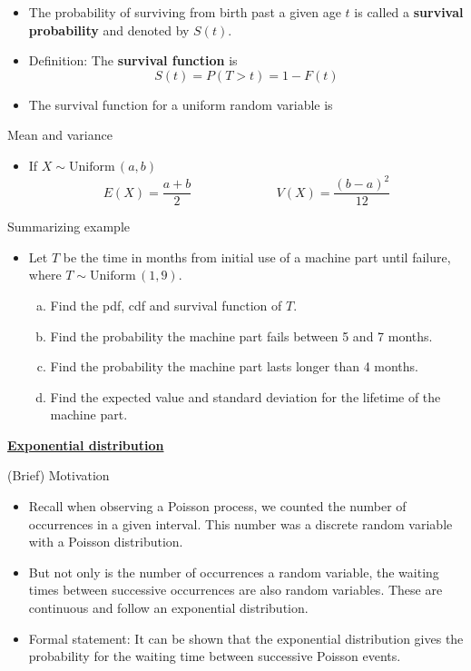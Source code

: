 \documentclass{article}
\newcommand{\bu}[1]{\textbf{\ul{#1}}}				%
\newcommand{\follow}[1]{\sim \text{#1}\,}		%
\begin{document}
\begin{itemize}
\begin{itemize}
    \end{itemize}
    \item The probability of surviving from birth past a given age $t$ is called a \textbf{survival probability} and denoted by $S(t)$.\bigskip
    \item Definition: The \textbf{survival function} is
    \[S(t) = P(T > t) = 1 - F(t)\]\vspace{20pt}
    \item The survival function for a uniform random variable is\vspace{80pt}
\end{itemize}\bigskip

Mean and variance\bigskip
\begin{itemize}
    \item If $X \follow{Uniform}(a, b)$\smallskip
    \[E(X) = \frac{a + b}{2} \hspace{80pt} V(X) = \frac{(b - a)^2}{12}\]
\end{itemize}\bigskip

Summarizing example\bigskip
\begin{itemize}
    \item Let $T$ be the time in months from initial use of a machine part until failure, where $T \follow{Uniform}(1, 9)$.
    \begin{enumerate}[a)]
        \item Find the pdf, cdf and survival function of $T$.\vspace{80pt}
        \item Find the probability the machine part fails between 5 and 7 months.\vspace{80pt}
        \item Find the probability the machine part lasts longer than 4 months.\vspace{80pt}
        \item Find the expected value and standard deviation for the lifetime of the machine part.\vspace{80pt}
    \end{enumerate}
\end{itemize}\bigskip

\bu{Exponential distribution}\bigskip

(Brief) Motivation\bigskip
\begin{itemize}
    \item Recall when observing a Poisson process, we counted the number of occurrences in a given interval. This number was a discrete random variable with a Poisson distribution.\vspace{40pt}
    \item But not only is the number of occurrences a random variable, the waiting times between successive occurrences are also random variables. These are continuous and follow an exponential distribution.
    \item Formal statement: It can be shown that the exponential distribution gives the probability for the waiting time between successive Poisson events.
\end{itemize}
\end{document}
